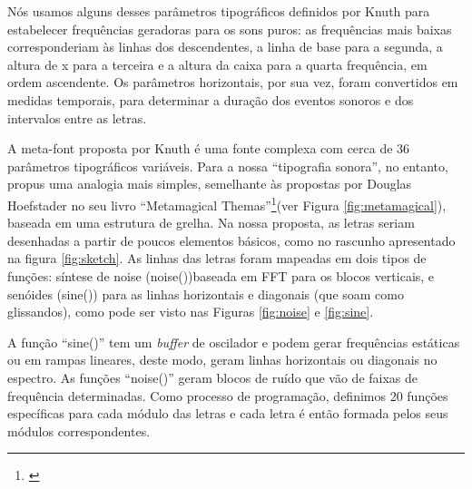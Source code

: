 Nós usamos alguns desses parâmetros tipográficos definidos por Knuth para estabelecer frequências geradoras para os sons puros: as frequências mais baixas corresponderiam às linhas dos descendentes, a linha de base para a segunda, a altura de x para a terceira e a altura da caixa para a quarta frequência, em ordem ascendente. Os parâmetros horizontais, por sua vez, foram convertidos em medidas temporais, para determinar a duração dos eventos sonoros e dos intervalos entre as letras.


A meta-font proposta por Knuth é uma fonte complexa com cerca de 36 parâmetros tipográficos variáveis. Para a nossa ``tipografia sonora'', no entanto, propus uma analogia mais simples, semelhante às propostas por Douglas Hoefstader no seu livro ``Metamagical Themas''\footnote{\cite{Metamagical1986}}(ver Figura \ref{fig:metamagical}), baseada em uma estrutura de grelha. Na nossa proposta, as letras seriam desenhadas a partir de poucos elementos básicos, como no rascunho apresentado na figura \ref{fig:sketch}. As linhas das letras foram mapeadas em dois tipos de funções: síntese de noise (noise())baseada em FFT para os blocos verticais, e senóides (sine()) para as linhas horizontais e diagonais (que soam como glissandos), como pode ser visto nas Figuras \ref{fig:noise} e \ref{fig:sine}. 




A função ``sine()'' tem um \emph{buffer} de oscilador e podem gerar frequências estáticas ou em rampas lineares, deste modo, geram linhas horizontais ou diagonais no espectro. As funções ``noise()'' geram blocos de ruído que vão de faixas de frequência determinadas. Como processo de programação, definimos 20 funções específicas para cada módulo das letras e cada letra é então formada pelos seus módulos correspondentes. 





